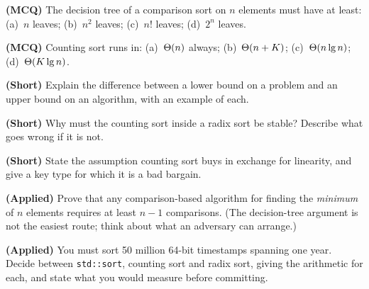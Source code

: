 \begin{reviewq}
  \item \textbf{(MCQ)} The decision tree of a comparison sort on $n$ elements
        must have at least: (a)~$n$ leaves; (b)~$n^{2}$ leaves; (c)~$n!$
        leaves; (d)~$2^{n}$ leaves.
  \item \textbf{(MCQ)} Counting sort runs in: (a)~$\Theta(n)$ always;
        (b)~$\Theta(n+K)$; (c)~$\Theta(n\operatorname{lg} n)$; (d)~$\Theta(K\operatorname{lg} n)$.
  \item \textbf{(Short)} Explain the difference between a lower bound on a
        problem and an upper bound on an algorithm, with an example of each.
  \item \textbf{(Short)} Why must the counting sort inside a radix sort be
        stable? Describe what goes wrong if it is not.
  \item \textbf{(Short)} State the assumption counting sort buys in exchange
        for linearity, and give a key type for which it is a bad bargain.
  \item \textbf{(Applied)} Prove that any comparison-based algorithm for
        finding the \emph{minimum} of $n$ elements requires at least $n-1$
        comparisons. (The decision-tree argument is not the easiest route; think
        about what an adversary can arrange.)
  \item \textbf{(Applied)} You must sort 50 million 64-bit timestamps spanning
        one year. Decide between \texttt{std::sort}, counting sort and radix
        sort, giving the arithmetic for each, and state what you would measure
        before committing.
\end{reviewq}
